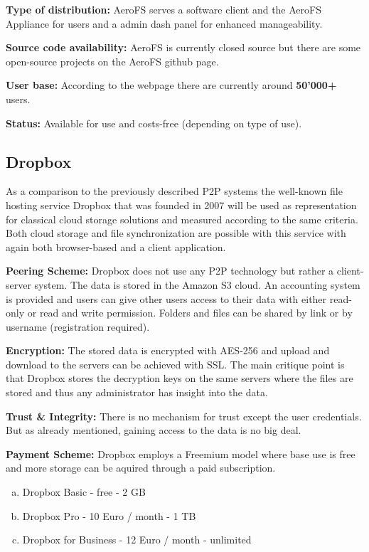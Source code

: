 \textbf{Type of distribution:} AeroFS serves a software client and the AeroFS Appliance for users and a admin dash panel for enhanced manageability.

\textbf{Source code availability:} AeroFS is currently closed source but there are some open-source projects on the AeroFS github page.

\textbf{User base:} According to the webpage \cite{aerofs} there are currently around \textbf{50'000\textsc{+}} users.

\textbf{Status:} Available for use and costs-free (depending on type of use).

\subsection{Dropbox}
As a comparison to the previously described P2P systems the well-known file hosting service Dropbox that was founded in 2007 will be used as representation for classical cloud storage solutions and measured according to the same criteria. Both cloud storage and file synchronization are possible with this service with again both browser-based and a client application.

\textbf{Peering Scheme:} Dropbox does not use any P2P technology but rather a client-server system. The data is stored in the Amazon S3 cloud. An accounting system is provided and users can give other users access to their data with either read-only or read and write permission. Folders and files can be shared by link or by username (registration required).

\textbf{Encryption:} The stored data is encrypted with AES-256 and upload and download to the servers can be achieved with SSL. The main critique point is that Dropbox stores the decryption keys on the same servers where the files are stored and thus any administrator has insight into the data.

\textbf{Trust \& Integrity:} There is no mechanism for trust except the user credentials. But as already mentioned, gaining access to the data is no big deal.

\textbf{Payment Scheme:} Dropbox employs a Freemium model where base use is free and more storage can be aquired through a paid subscription.
\begin{enumerate}[(a)]
	\item Dropbox Basic - free - 2 GB
	\item Dropbox Pro - 10 Euro / month - 1 TB
	\item Dropbox for Business - 12 Euro / month - unlimited
\end{enumerate}

